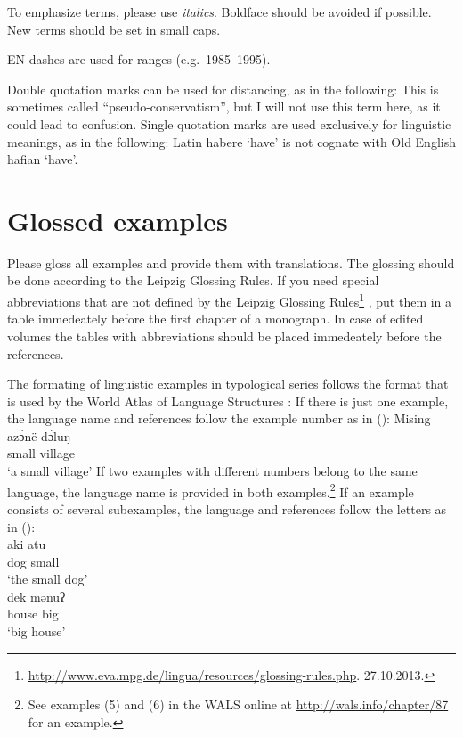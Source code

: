 To emphasize terms, please use \emph{italics}. Boldface should be avoided if
possible. New terms should be set in {\sc small caps}.

EN-dashes are used for ranges (e.g.\ 1985–1995).

Double quotation marks can be used for distancing, as in the following:
\ea
This is sometimes called ``pseudo-conservatism'', but I will not use this term here, as it could lead
to confusion.
\z
Single quotation marks are used exclusively for linguistic meanings, as in the following:
\ea
Latin habere `have’ is not cognate with Old English hafian `have’.
\z

\section{Glossed examples}

Please gloss all examples and provide them with translations. The glossing should be done according
to the Leipzig Glossing Rules. If you need special abbreviations that are not defined by the Leipzig
Glossing Rules\footnote{
\url{http://www.eva.mpg.de/lingua/resources/glossing-rules.php}. 27.10.2013.
}
, put them in a table immedeately before the first chapter of a
monograph. In case of edited volumes the tables with abbreviations should be placed immedeately
before the references.

The formating of linguistic examples in typological series follows the format that is used by the
World Atlas of Language Structures \citep{DM2013a-ed}: If there is just one example, the language name and references
follow the example number as in ():
{\def\exfont{\normalsize\itshape}
\ea\label{ex-typology}
{\rm Mising \citep[69]{Prasad91a}}\\
\gll azɔ́në dɔ́luŋ\\
     small village\\ 
\glt `a small village' 
\z
If two examples with different numbers belong to the same language, the language name is provided in
both examples.\footnote{
  See examples (5) and (6) in the WALS online at \url{http://wals.info/chapter/87} for an example.
}
If an example consists of several subexamples, the language and references follow the letters as in
():
\eal
{}\\
\gll aki atu\\ 
     dog small\\ 
\glt ‘the small dog’ 
\\ 
\gll dēk mənūʔ\\
     house big\\
\glt ‘big house’ 
\zl
}


